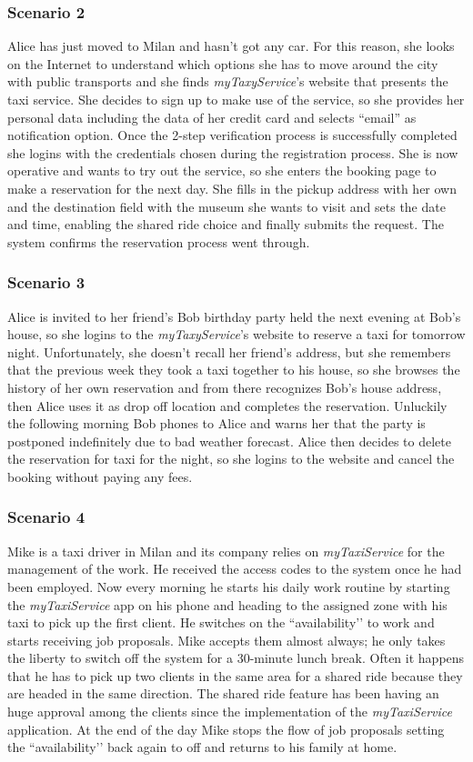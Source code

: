 \documentclass[a4paper,11pt]{report} %
\newcommand{\mts}{\mbox{\normalfont\itshape myTaxiService}}
\begin{document}
	\subsubsection{Scenario 2} Alice has just moved to Milan and hasn’t got any car. For this reason, she looks on the Internet to understand which options she has to move around the city with public transports and she finds {\em myTaxyService}'s website that presents the taxi service. She decides to sign up to make use of the service, so she provides her personal data including the data of her credit card and selects ``email'' as notification option. Once the 2-step verification process is successfully completed she logins with the credentials chosen during the registration process. She is now operative and wants to try out the service, so she enters the booking page to make a reservation for the next day. She fills in the pickup address with her own and the destination field with the museum she wants to visit and sets the date and time, enabling the shared ride choice and finally submits the request. The system confirms the reservation process went through. 
	
	\subsubsection{Scenario 3} Alice is invited to her friend’s Bob birthday party held the next evening at Bob’s house, so she logins to the {\em myTaxyService}'s website to reserve a taxi for tomorrow night. Unfortunately, she doesn’t recall her friend’s address, but she remembers that the previous week they took a taxi together to his house, so she browses the history of her own reservation and from there recognizes Bob’s house address, then Alice uses it as drop off location and completes the reservation. Unluckily the following morning Bob phones to Alice and warns her that the party is postponed indefinitely due to bad weather forecast. Alice then decides to delete the reservation for taxi for the night, so she logins to the website and cancel the booking without paying any fees.
	
	\subsubsection{Scenario 4} Mike is a taxi driver in Milan and its company relies on \mts{} for the management of the work. He received the access codes to the system once he had been employed. Now every morning he starts his daily work routine by starting the \mts{} app on his phone and heading to the assigned zone with his taxi to pick up the first client. He switches on the ``availability’’ to work and starts receiving job proposals. Mike accepts them almost always; he only takes the liberty to switch off the system for a 30-minute lunch break. Often it happens that he has to pick up two clients in the same area for a shared ride because they are headed in the same direction. The shared ride feature has been having an huge approval among the clients since the implementation of the \mts{} application. At the end of the day Mike stops the flow of job proposals setting the ``availability’’ back again to off and returns to his family at home.
	
\end{document}
